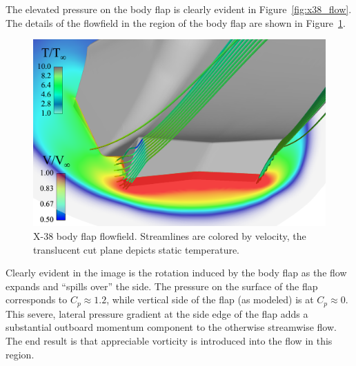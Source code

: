 The elevated pressure on the body flap is clearly evident in Figure~\ref{fig:x38_flow}.  The details of the flowfield in the region of the body flap are shown in Figure~\ref{fig:x38_body_flap}.
\begin{figure}[hbtp]
  \begin{center}
    \includegraphics[width=\textwidth]{figures/x38/bf-small}
    \caption[X-38 body flap flowfield.]{X-38 body flap flowfield. Streamlines are colored by velocity, the translucent cut plane depicts static temperature.\label{fig:x38_body_flap}}
  \end{center}
\end{figure}
Clearly evident in the image is the rotation induced by the body flap as the flow expands and ``spills over'' the side.  The pressure on the surface of the flap corresponds to $C_p\approx 1.2$, while vertical side of the flap (as modeled) is at $C_p \approx 0$.  This severe, lateral pressure gradient at the side edge of the flap adds a substantial outboard momentum component to the otherwise streamwise flow.  The end result is that appreciable vorticity is introduced into the flow in this region.


